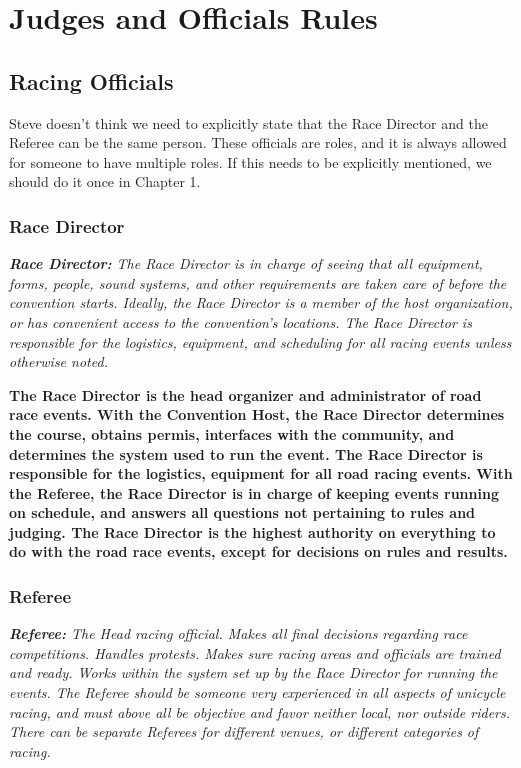 \chapter{Judges and Officials Rules}

\section{Racing Officials}

\begin{framed}
Steve doesn't think we need to explicitly state that the Race Director and the Referee can be the same person.  These officials are roles, and it is always allowed for someone to have multiple roles.  If this needs to be explicitly mentioned, we should do it once in Chapter 1.
\end{framed}

\subsection{Race Director}

\textit{\textbf{Race Director:} The Race Director is in charge of seeing that all equipment, forms, people, sound systems, and other requirements are taken care of before the convention starts.
Ideally, the Race Director is a member of the host organization, or has convenient access to the convention's locations.
The Race Director is responsible for the logistics, equipment, and scheduling for all racing events unless otherwise noted.}

\textbf{The Race Director is the head organizer and administrator of road race
events.  With the Convention Host, the Race Director determines the course,
obtains permis, interfaces with the community, and determines the system
used to run the event.  The Race Director is responsible for the logistics,
equipment for all road racing events.  With the Referee, the
Race Director is in charge of keeping events running on schedule, and
answers all questions not pertaining to rules and judging.  The Race
Director is the highest authority on everything to do with the road race
events, except for decisions on rules and results.}

\subsection{Referee}

\textit{\textbf{Referee:} The Head racing official.
Makes all final decisions regarding race competitions.
Handles protests.
Makes sure racing areas and officials are trained and ready.
Works within the system set up by the Race Director for running the events.
The Referee should be someone very experienced in all aspects of unicycle racing, and must above all be objective and favor neither local, nor outside riders.
There can be separate Referees for different venues, or different categories of racing.}

